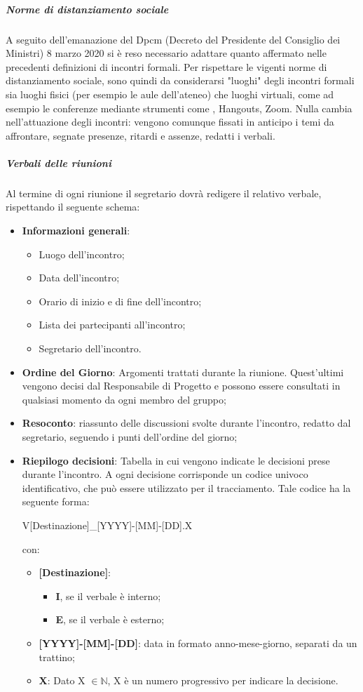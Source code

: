 \subparagraph*{Norme di distanziamento sociale}
A seguito dell'emanazione del Dpcm (Decreto del Presidente del Consiglio dei Ministri) 8 marzo 2020 si è reso necessario adattare quanto affermato nelle precedenti definizioni di incontri formali.
Per rispettare le vigenti norme di distanziamento sociale, sono quindi da considerarsi "luoghi" degli incontri formali sia luoghi fisici (per esempio le aule dell'ateneo) che luoghi virtuali, come ad esempio le conferenze mediante strumenti come , Hangouts, Zoom.
Nulla cambia nell'attuazione degli incontri: vengono comunque fissati in anticipo i temi da affrontare, segnate presenze, ritardi e assenze, redatti i verbali.

\subparagraph*{Verbali delle riunioni}
Al termine di ogni riunione il segretario dovrà redigere il relativo verbale, rispettando il seguente
schema:
\begin{itemize}
	\item \textbf{Informazioni generali}:
	\begin{itemize}
		\item Luogo dell'incontro;
		\item Data dell'incontro;
		\item Orario di inizio e di fine dell'incontro;
		\item Lista dei partecipanti all'incontro;
		\item Segretario dell'incontro.
	\end{itemize}
	\item \textbf{Ordine del Giorno}: Argomenti trattati durante la riunione. Quest’ultimi vengono decisi dal Responsabile di Progetto e possono essere consultati in qualsiasi momento da ogni membro del gruppo;
	\item \textbf{Resoconto}: riassunto delle discussioni svolte durante l'incontro, redatto dal segretario, seguendo i punti dell’ordine del giorno;
	\item \textbf{Riepilogo decisioni}: Tabella in cui vengono indicate le decisioni prese durante l'incontro.
	A ogni decisione corrisponde un codice univoco identificativo, che può essere utilizzato per il tracciamento.
	Tale codice ha la seguente forma:
	\begin{center}
		V[Destinazione]\_[YYYY]-[MM]-[DD].X	
	\end{center}
	con:
	\begin{itemize}
		\item \textbf{[Destinazione]}:
		\begin{itemize}
			\item \textbf{I}, se il verbale è interno;
			\item \textbf{E}, se il verbale è esterno;
		\end{itemize}
		\item \textbf{[YYYY]-[MM]-[DD]}: data in formato anno-mese-giorno, separati da un trattino;
		\item \textbf{X}: Dato X $\in \mathbb{N}$, X è un numero progressivo per indicare la decisione.
	\end{itemize}
\end{itemize}

